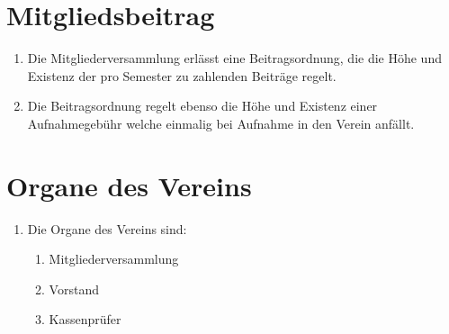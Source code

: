 \documentclass{article}
\begin{document}
\section{Mitgliedsbeitrag}
\label{sec:mitgliedsbeitrag}
\begin{enumerate}
\item Die Mitgliederversammlung erlässt eine Beitragsordnung, die die Höhe und Existenz der pro Semester zu zahlenden Beiträge regelt.
\item Die Beitragsordnung regelt ebenso die Höhe und Existenz einer Aufnahmegebühr welche einmalig bei Aufnahme in den Verein anfällt.
\end{enumerate}

\section{Organe des Vereins}
\label{sec:organe}
\begin{enumerate}

\item Die Organe des Vereins sind:
	\begin{enumerate}
		\item Mitgliederversammlung
		\item Vorstand
		\item Kassenprüfer
	\end{enumerate}
\end{enumerate}
\end{document}
